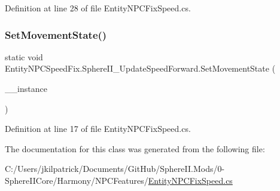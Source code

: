 Definition at line 28 of file Entity\+N\+P\+C\+Fix\+Speed.\+cs.

\mbox{\label{class_entity_n_p_c_speed_fix_1_1_sphere_i_i___update_speed_forward_a91173b62ec69b6d116c9cf3b7a1e52ed}} 
\subsubsection{\texorpdfstring{SetMovementState()}{SetMovementState()}}
{\footnotesize\ttfamily static void Entity\+N\+P\+C\+Speed\+Fix.\+Sphere\+I\+I\+\_\+\+Update\+Speed\+Forward.\+Set\+Movement\+State (\begin{DoxyParamCaption}\item[{Entity\+N\+PC}]{\+\_\+\+\_\+instance }\end{DoxyParamCaption})\hspace{0.3cm}{\ttfamily [static]}}



Definition at line 17 of file Entity\+N\+P\+C\+Fix\+Speed.\+cs.



The documentation for this class was generated from the following file\+:\begin{DoxyCompactItemize}
\item 
C\+:/\+Users/jkilpatrick/\+Documents/\+Git\+Hub/\+Sphere\+I\+I.\+Mods/0-\/\+Sphere\+I\+I\+Core/\+Harmony/\+N\+P\+C\+Features/\mbox{\hyperlink{_entity_n_p_c_fix_speed_8cs}{Entity\+N\+P\+C\+Fix\+Speed.\+cs}}\end{DoxyCompactItemize}
